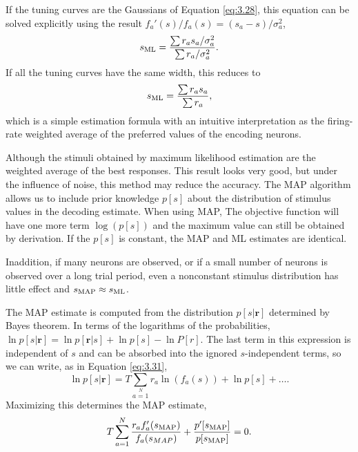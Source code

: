 \begin{exm}
  If the tuning curves are the Gaussians of Equation \ref{eq:3.28},
  this equation can be solved explicitly using the result
  $f_{a}'(s)/f_a(s)=(s_{a}-s)/\sigma_{a}^{2}$,
    \begin{equation}
      \label{eq:3.33}
      s_{\rm{ML}}=\frac{\sum{r_as_a/\sigma_{a}^{2}}}{\sum{r_a/\sigma_{a}^{2}}}.
    \end{equation}
    If all the tuning curves have the same width, this reduces to
    \begin{equation}
      \label{eq:3.34}
      s_{\rm{ML}}=\frac{\sum{r_as_a}}{\sum{r_a}},
  \end{equation}
  which is a simple estimation formula with an intuitive interpretation as
the firing-rate weighted average of the preferred values of the encoding
neurons.
\end{exm}

\begin{rem}
  Although the stimuli obtained by maximum likelihood estimation are
  the weighted average of the best responses. This result looks very
  good, but under the influence of noise, this method may reduce the
  accuracy. The MAP algorithm allows us to include prior knowledge $p[s]$
about the distribution of stimulus values in the decoding estimate. When using
  MAP, The objective function will have one more term $\log(p[s])$
  and the maximum value can still be obtained by derivation. If the
  $p[s]$ is constant, the MAP and ML estimates are
  identical.

   Inaddition, if many neurons are observed, or if a small
  number of neurons is observed over a long trial period, even a
  nonconstant stimulus distribution has little effect and $s_{\rm{MAP}}\approx s_{\rm{ML}}$.
\end{rem}

\begin{prop}
  The MAP estimate is computed from the distribution $p[s|\mathbf{r}]$ determined by
Bayes theorem. In terms of the logarithms of the probabilities, $\ln
p[s|\mathbf{r}]=\ln p[\mathbf{r}|s]+\ln p[s]-\ln P[r]$. The last
term in this expression is independent of $s$ and can be absorbed into the ignored $s$-independent terms, so we can
write, as in Equation \ref{eq:3.31},
\begin{equation}
  \label{eq:3.35}
 \ln p[s|\mathbf{r}]=T\sum\limits_{a=1}\limits^{N}{r_{a}\ln \left(
     f_a(s) \right)+\ln p[s]+\dots}.
 \end{equation}
 Maximizing this determines the MAP estimate,
 \begin{equation}
   \label{eq:3.36}
    T\sum\limits_{a=1}\limits^{N}{\frac{r_{a}f_{a}'(s_{\rm{MAP}})}{f_{a}(s_{MAP})}}+\frac{p'[s_{\rm{MAP}}]}{p[s_{\rm{MAP}}]}=0.
 \end{equation}
\end{prop}

